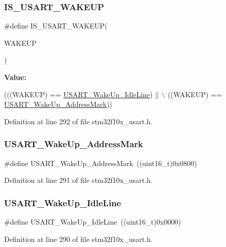 \subsubsection{\texorpdfstring{I\+S\+\_\+\+U\+S\+A\+R\+T\+\_\+\+W\+A\+K\+E\+UP}{IS\_USART\_WAKEUP}}
{\footnotesize\ttfamily \#define I\+S\+\_\+\+U\+S\+A\+R\+T\+\_\+\+W\+A\+K\+E\+UP(\begin{DoxyParamCaption}\item[{}]{W\+A\+K\+E\+UP }\end{DoxyParamCaption})}

{\bfseries Value\+:}
\begin{DoxyCode}
(((WAKEUP) == \hyperlink{group___u_s_a_r_t___wake_up__methods_ga9646d71590d5cef29ee12da0bb431d92}{USART\_WakeUp\_IdleLine}) || \(\backslash\)
                                 ((WAKEUP) == \hyperlink{group___u_s_a_r_t___wake_up__methods_ga9f63c1671060682adee91b9a2f3202e4}{USART\_WakeUp\_AddressMark}))
\end{DoxyCode}


Definition at line 292 of file stm32f10x\+\_\+usart.\+h.

\mbox{\label{group___u_s_a_r_t___wake_up__methods_ga9f63c1671060682adee91b9a2f3202e4}} 
\subsubsection{\texorpdfstring{U\+S\+A\+R\+T\+\_\+\+Wake\+Up\+\_\+\+Address\+Mark}{USART\_WakeUp\_AddressMark}}
{\footnotesize\ttfamily \#define U\+S\+A\+R\+T\+\_\+\+Wake\+Up\+\_\+\+Address\+Mark~((uint16\+\_\+t)0x0800)}



Definition at line 291 of file stm32f10x\+\_\+usart.\+h.

\mbox{\label{group___u_s_a_r_t___wake_up__methods_ga9646d71590d5cef29ee12da0bb431d92}} 
\subsubsection{\texorpdfstring{U\+S\+A\+R\+T\+\_\+\+Wake\+Up\+\_\+\+Idle\+Line}{USART\_WakeUp\_IdleLine}}
{\footnotesize\ttfamily \#define U\+S\+A\+R\+T\+\_\+\+Wake\+Up\+\_\+\+Idle\+Line~((uint16\+\_\+t)0x0000)}



Definition at line 290 of file stm32f10x\+\_\+usart.\+h.

